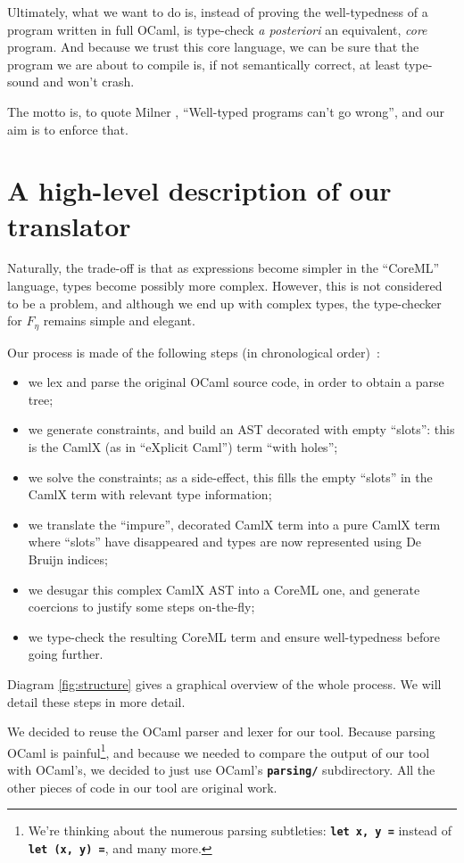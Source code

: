 \documentclass[10pt,a4paper,twoside,titlepage,twocolumn]{article}
\newcommand{\code}[1]{\textbf{\texttt{#1}}}
\begin{document}
Ultimately, what we want to do is, instead of proving the well-typedness of a
program written in full OCaml, is type-check \emph{a posteriori} an equivalent,
\emph{core} program. And because we trust this core language, we can be sure
that the program we are about to compile is, if not semantically correct, at
least type-sound and won't crash.

The motto is, to quote Milner \cite{milner1978theory}, ``Well-typed programs
can't go wrong'', and our aim is to enforce that.

\section{A high-level description of our translator}

Naturally, the trade-off is that as expressions become simpler in the ``CoreML''
language, types become possibly more complex. However, this is not considered to
be a problem, and although we end up with complex types, the type-checker for
$F_\eta$ remains simple and elegant.

Our process is made of the following steps (in chronological order)~:
\begin{itemize}
  \item we lex and parse the original OCaml source code, in order to obtain a
    parse tree;
  \item we generate constraints, and build an AST decorated with empty
    ``slots'': this is the CamlX (as in ``eXplicit Caml'') term ``with holes'';
  \item we solve the constraints; as a side-effect, this fills the empty
    ``slots'' in the CamlX term with relevant type information;
  \item we translate the ``impure'', decorated CamlX term into a pure CamlX term
    where ``slots'' have disappeared and types are now represented using De
    Bruijn indices;
  \item we desugar this complex CamlX AST into a CoreML one, and generate
    coercions to justify some steps on-the-fly;
  \item we type-check the resulting CoreML term and ensure well-typedness before
    going further.
\end{itemize}

Diagram \vref{fig:structure} gives a graphical overview of the whole process. We
will detail these steps in more detail.

We decided to reuse the OCaml parser and lexer for our tool. Because parsing
OCaml is painful\footnote{We're thinking about the numerous parsing subtleties:
\code{let x, y =} instead of \code{let (x, y) =}, and many more.}, and because
we needed to compare the output of our tool with OCaml's, we decided to just use
OCaml's \code{parsing/} subdirectory. All the other pieces of code in our tool
are original work.
\end{document}

